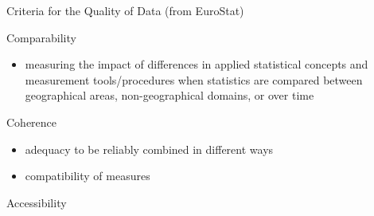 \documentclass[xcolor=x11names,compress,8pt,
handout
]{beamer}
\renewcommand{\(}{\begin{columns}}
\renewcommand{\)}{\end{columns}}
\newcommand{\<}[1]{\begin{column}{#1}}
\renewcommand{\>}{\end{column}}
\begin{document}
\begin{frame}{Criteria for the Quality of Data (from EuroStat)}
\begin{alertblock}{Comparability}
\begin{itemize}
\item measuring the impact of differences in applied statistical concepts and
measurement tools/procedures when statistics are compared between geographical areas,
non-geographical domains, or over time
\end{itemize}
\end{alertblock}
\pause
\begin{alertblock}{Coherence}
\begin{itemize}
\item adequacy to be reliably combined in different ways 
\item compatibility of measures 
\end{itemize}
\end{alertblock}
\pause
\begin{alertblock}{Accessibility}
%

\end{alertblock}
\end{frame}
\end{document}
